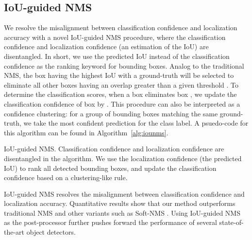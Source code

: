 \documentclass[runningheads]{llncs}
\begin{document}
\subsection{IoU-guided NMS}
\label{sec:iouguided NMS}
We resolve the misalignment between classification confidence and localization accuracy with a novel IoU-guided NMS procedure, where the classification confidence and localization confidence (an estimation of the IoU) are  disentangled.
In short, we use the predicted IoU instead of the classification confidence as the ranking keyword for bounding boxes. Analog to the traditional NMS, the box having the highest IoU with a ground-truth will be selected to eliminate all other boxes having an overlap greater than a given threshold . To determine the classification scores, when a box  eliminates box , we update the classification confidence  of box  by . This procedure can also be interpreted as a confidence clustering: for a group of bounding boxes matching the same ground-truth, we take the most confident prediction for the class label. A psuedo-code for this algorithm can be found in Algorithm~\ref{alg:iounms}.

\begin{algorithm}[!t]
\caption{IoU-guided NMS. Classification confidence and localization confidence are disentangled in the algorithm. We use the localization confidence (the predicted IoU) to rank all detected bounding boxes, and update the classification confidence based on a clustering-like rule.}
\label{alg:iounms}
\begin{algorithmic}[1]
\State{}
\While{}
    \State{}
    \State{}
    \State{}
    \For{}
        \If{}
            \State{}
            \State{}
        \EndIf
    \EndFor
    \State{}
\EndWhile
\State{\Return{}}
\end{algorithmic}
\end{algorithm}

IoU-guided NMS resolves the misalignment between classification confidence and localization accuracy.
Quantitative results show that our method outperforms traditional NMS and other variants such as Soft-NMS \cite{bodla2017improving}. Using IoU-guided NMS as the post-processor further pushes forward the performance of several state-of-the-art object detectors.
\end{document}
